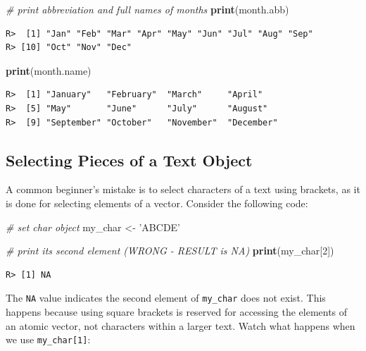 \documentclass[
  12pt,
]{book}
\newenvironment{Shaded}{\begin{snugshade}}{\end{snugshade}}
\newcommand{\CommentTok}[1]{\textcolor[rgb]{0.37,0.37,0.37}{\textit{#1}}}
\newcommand{\DecValTok}[1]{\textcolor[rgb]{0.06,0.06,0.06}{#1}}
\newcommand{\KeywordTok}[1]{\textcolor[rgb]{0.27,0.27,0.27}{\textbf{#1}}}
\newcommand{\NormalTok}[1]{#1}
\newcommand{\StringTok}[1]{\textcolor[rgb]{0.5,0.5,0.5}{#1}}
\begin{document}
\begin{Shaded}
\begin{Highlighting}[]
\CommentTok{# print abbreviation and full names of months}
\KeywordTok{print}\NormalTok{(month.abb)}
\end{Highlighting}
\end{Shaded}

\begin{verbatim}
R>  [1] "Jan" "Feb" "Mar" "Apr" "May" "Jun" "Jul" "Aug" "Sep"
R> [10] "Oct" "Nov" "Dec"
\end{verbatim}

\begin{Shaded}
\begin{Highlighting}[]
\KeywordTok{print}\NormalTok{(month.name)}
\end{Highlighting}
\end{Shaded}

\begin{verbatim}
R>  [1] "January"   "February"  "March"     "April"    
R>  [5] "May"       "June"      "July"      "August"   
R>  [9] "September" "October"   "November"  "December"
\end{verbatim}

\hypertarget{selecting-pieces-of-a-text-object}{%
\subsection{Selecting Pieces of a Text Object}\label{selecting-pieces-of-a-text-object}}

A common beginner's mistake is to select characters of a text using brackets, as it is done for selecting elements of a vector. Consider the following code:

\begin{Shaded}
\begin{Highlighting}[]
\CommentTok{# set char object}
\NormalTok{my_char <-}\StringTok{ 'ABCDE'}

\CommentTok{# print its second element (WRONG - RESULT is NA)}
\KeywordTok{print}\NormalTok{(my_char[}\DecValTok{2}\NormalTok{])}
\end{Highlighting}
\end{Shaded}

\begin{verbatim}
R> [1] NA
\end{verbatim}

The \texttt{NA} value indicates the second element of \texttt{my\_char} does not exist. This happens because using square brackets is reserved for accessing the elements of an atomic vector, not characters within a larger text. Watch what happens when we use \texttt{my\_char{[}1{]}}:
\end{document}
